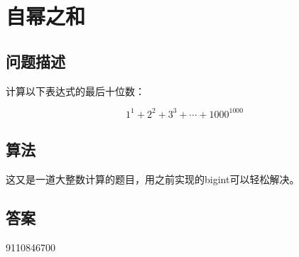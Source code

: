 \section{自幂之和}\label{sec:problem48}
\subsection{问题描述}
\begin{tcolorbox}

计算以下表达式的最后十位数：

\[
1^1 + 2^2 + 3^3 + \cdots + 1000^{1000}
\]


\end{tcolorbox}

\subsection{算法}
这又是一道大整数计算的题目，用之前实现的bigint可以轻松解决。


\subsection{答案}
9110846700
